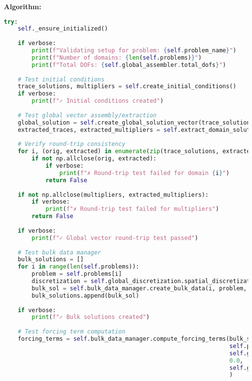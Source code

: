 \textbf{Algorithm:}
\begin{lstlisting}[language=Python, caption=Validate Setup Algorithm]
try:
    self._ensure_initialized()
    
    if verbose:
        print(f"Validating setup for problem: {self.problem_name}")
        print(f"Number of domains: {len(self.problems)}")
        print(f"Total DOFs: {self.global_assembler.total_dofs}")
    
    # Test initial conditions
    trace_solutions, multipliers = self.create_initial_conditions()
    if verbose:
        print(f"✓ Initial conditions created")
    
    # Test global vector assembly/extraction
    global_solution = self.create_global_solution_vector(trace_solutions, multipliers)
    extracted_traces, extracted_multipliers = self.extract_domain_solutions(global_solution)
    
    # Verify round-trip consistency
    for i, (orig, extracted) in enumerate(zip(trace_solutions, extracted_traces)):
        if not np.allclose(orig, extracted):
            if verbose:
                print(f"✗ Round-trip test failed for domain {i}")
            return False
    
    if not np.allclose(multipliers, extracted_multipliers):
        if verbose:
            print(f"✗ Round-trip test failed for multipliers")
        return False
    
    if verbose:
        print(f"✓ Global vector round-trip test passed")
    
    # Test bulk data manager
    bulk_solutions = []
    for i in range(len(self.problems)):
        problem = self.problems[i]
        discretization = self.global_discretization.spatial_discretizations[i]
        bulk_sol = self.bulk_data_manager.create_bulk_data(i, problem, discretization)
        bulk_solutions.append(bulk_sol)
    
    if verbose:
        print(f"✓ Bulk solutions created")
    
    # Test forcing term computation
    forcing_terms = self.bulk_data_manager.compute_forcing_terms(bulk_solutions, 
                                                                 self.problems, 
                                                                 self.global_discretization.spatial_discretizations, 
                                                                 0.0, 
                                                                 self.global_discretization.dt
                                                                 )


\end{lstlisting}
